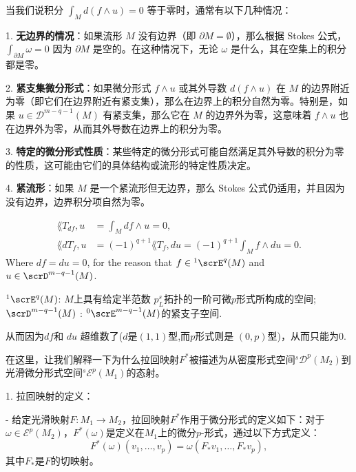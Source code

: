 \documentclass[lang=cn,zihao=-4,a4paper,fontset=none]{beautybook}
\begin{document}
当我们说积分 $\int_M d(f \wedge u) = 0$ 等于零时，通常有以下几种情况：

1. \textbf{无边界的情况}：如果流形 $M$ 没有边界（即 $\partial M = \emptyset$），那么根据 Stokes 公式，$\int_{\partial M} \omega = 0$ 因为 $\partial M$ 是空的。在这种情况下，无论 $\omega$ 是什么，其在空集上的积分都是零。

2. \textbf{紧支集微分形式}：如果微分形式 $f \wedge u$ 或其外导数 $d(f \wedge u)$ 在 $M$ 的边界附近为零（即它们在边界附近有紧支集），那么在边界上的积分自然为零。特别是，如果 $u \in \mathscr{D}^{m-q-1}(M)$ 有紧支集，那么它在 $M$ 的边界外为零，这意味着 $f \wedge u$ 也在边界外为零，从而其外导数在边界上的积分为零。

3. \textbf{特定的微分形式性质}：某些特定的微分形式可能自然满足其外导数的积分为零的性质，这可能由它们的具体结构或流形的特定性质决定。

4. \textbf{紧流形}：如果 $M$ 是一个紧流形但无边界，那么 Stokes 公式仍适用，并且因为没有边界，边界积分项自然为零。
\begin{fancybox}
\begin{align*}
    \lang{T_{df} ,u} &= \int_M df\wedge u=0,\\ 
\lang{dT_f,u} &=(-1)^{q+1}\lang{T_f,du}=(-1)^{q+1}\int_M f\wedge du=0.
\end{align*}
    Where $df=du=0$, for the reason that $f\in {}^1\scrE^q(M)$ and $u\in \scrD^{m-q-1}(M)$.
\end{fancybox}
\begin{remark}
    ${}^1\scrE^q(M)$: $M$上具有给定半范数 $p^s_L$拓扑的一阶可微$p$形式所构成的空间;
    $\scrD^{m-q-1}(M)$ : ${}^0\scrE^{m-q-1}(M)$的紧支子空间.

从而因为$df$和 $du$ 超维数了($d$是$(1,1)$型,而$p$形式则是 $(0,p)$型)，从而只能为$0$.
\end{remark}


在这里，让我们解释一下为什么拉回映射$F^*$被描述为从密度形式空间$^s\mathscr{D}^p(M_2)$到光滑微分形式空间$^s\mathscr{E}^p(M_1)$的态射。

1. 拉回映射的定义：

   - 给定光滑映射$F: M_1 \to M_2$，拉回映射$F^*$作用于微分形式的定义如下：对于$\omega \in \mathscr{E}^p(M_2)$，$F^*(\omega)$是定义在$M_1$上的微分$p$-形式，通过以下方式定义：$$F^*(\omega)(v_1, \ldots, v_p) = \omega(F_*v_1, \ldots, F_*v_p),$$ 其中$F_*$是$F$的切映射。
\end{document}
